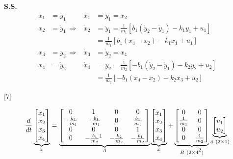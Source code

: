 \documentclass[11pt,a4paper]{article}
\begin{document}
\textbf{S.S.}
\begin{align*}
x_1&=y_1 & \dot{x}_1&=\dot{y}_1=x_2\\
x_2&=\dot{y}_1\ \Rightarrow & \dot{x}_2&=\ddot{y}_1=\frac{1}{m_1}\left[b_1(\dot{y}_2-\dot{y}_1)-k_1y_1+u_1\right]\\
&&&=\frac{1}{m_1}\left[b_1(x_4-x_2)-k_1x_1+u_1\right]\\
x_3&=y_2\ \Rightarrow & \dot{x}_3&=\dot{y}_2=x_4\\
x_4&=\dot{y}_2 & \dot{x}_4&=\ddot{y}_2=\frac{1}{m_2}\left[-b_1(\dot{y}_2-\dot{y}_1)-k_2y_2+u_2\right]\\
&&&=\frac{1}{m_2}\left[-b_1(x_4-x_2)-k_2x_3+u_2\right]
\end{align*}

[7]

{\setlength{\arraycolsep}{2pt}
\[
\frac{d}{dt}\underbrace{\begin{bmatrix}x_1\\x_2\\x_3\\x_4\end{bmatrix}}_{\dot{x}}
=
\underbrace{\begin{bmatrix}
0&1&0&0\\
-\frac{k_1}{m_1}&-\frac{b_1}{m_1}&0&\frac{b_1}{m_1}\\
0&0&0&1\\
0&-\frac{b_1}{m_2}\footnotemark&-\frac{k_2}{m_2}&-\frac{b_1}{m_2}
\end{bmatrix}}_{A}
\underbrace{\begin{bmatrix}x_1\\x_2\\x_3\\x_4\end{bmatrix}}_{x}
+
\underbrace{\begin{bmatrix}
0&0\\
\frac{1}{m_1}&0\\
0&0\\
0&\frac{1}{m_2}
\end{bmatrix}}_{B\ (2\times4\footnotemark)}
\underbrace{\begin{bmatrix}u_1\\u_2\end{bmatrix}}_{\vec{u}\ (2\times1)}
\]}
\addtocounter{footnote}{-1}%
\addtocounter{footnote}{1}
\end{document}
